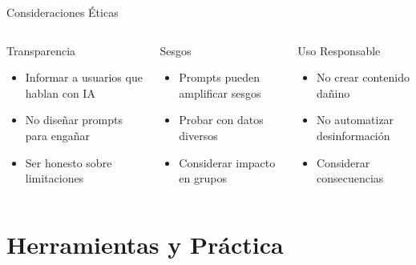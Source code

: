 \documentclass[aspectratio=169]{beamer}
\begin{document}
\begin{frame}{Consideraciones Éticas}
    \begin{columns}[t]
        \begin{block}{Transparencia}
            \begin{itemize}
                \item Informar a usuarios que hablan con IA
                \item No diseñar prompts para engañar
                \item Ser honesto sobre limitaciones
            \end{itemize}
        \end{block}
        
        \begin{block}{Sesgos}
            \begin{itemize}
                \item Prompts pueden amplificar sesgos
                \item Probar con datos diversos
                \item Considerar impacto en grupos
            \end{itemize}
        \end{block}
        
        \begin{block}{Uso Responsable}
            \begin{itemize}
                \item No crear contenido dañino
                \item No automatizar desinformación
                \item Considerar consecuencias
            \end{itemize}
        \end{block}

    \end{columns}
\end{frame}

\section{Herramientas y Práctica}
\end{document}
